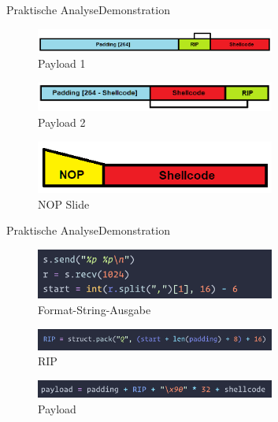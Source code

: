 \begin{frame}{Praktische Analyse}{Demonstration}
    \begin{figure}[h]
        \centering
        \includegraphics[width=0.7\textwidth,height=0.75\textheight,keepaspectratio]{images/payload1.png}
        \caption{Payload 1}
    \end{figure}
    \begin{figure}[h]
        \centering
        \includegraphics[width=0.7\textwidth,height=0.75\textheight,keepaspectratio]{images/payload2.png}
        \caption{Payload 2}
    \end{figure}
    \begin{figure}[h]
        \centering
        \includegraphics[width=0.7\textwidth,height=0.75\textheight,keepaspectratio]{images/nop.png}
        \caption{NOP Slide}
    \end{figure}
\end{frame}

\begin{frame}{Praktische Analyse}{Demonstration}
    \begin{figure}[h]
        \centering
        \includegraphics[width=0.7\textwidth,height=0.75\textheight,keepaspectratio]{images/format.png}
        \caption{Format-String-Ausgabe}
    \end{figure}
    \begin{figure}[h]
        \centering
        \includegraphics[width=0.7\textwidth,height=0.75\textheight,keepaspectratio]{images/rip.png}
        \caption{RIP}
    \end{figure}
    \begin{figure}[h]
        \centering
        \includegraphics[width=0.7\textwidth,height=0.75\textheight,keepaspectratio]{images/payload.png}
        \caption{Payload}
    \end{figure}
\end{frame}

